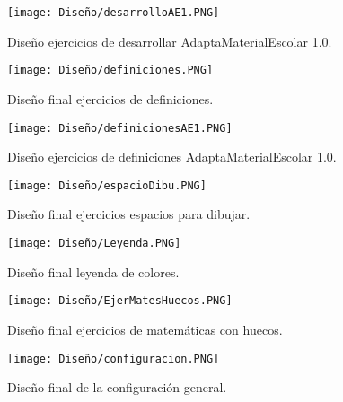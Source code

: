 \begin{figure}[ht!]
  \centering
  \texttt{[image: Diseño/desarrolloAE1.PNG]}
  \caption{Diseño ejercicios de desarrollar AdaptaMaterialEscolar 1.0.}
  \label{desAE1}
\end{figure}

\begin{figure}[ht!]
  \centering
  \texttt{[image: Diseño/definiciones.PNG]}
  \caption{Diseño final ejercicios de definiciones.}
  \label{defi}
\end{figure}

\begin{figure}[ht!]
  \centering
  \texttt{[image: Diseño/definicionesAE1.PNG]}
  \caption{Diseño ejercicios de definiciones AdaptaMaterialEscolar 1.0.}
  \label{defiAE1}
\end{figure}

\begin{figure}[ht!]
  \centering
  \texttt{[image: Diseño/espacioDibu.PNG]}
  \caption{Diseño final ejercicios espacios para dibujar.}
  \label{espaciosDibu}
\end{figure}

\begin{figure}[ht!]
  \centering
  \texttt{[image: Diseño/Leyenda.PNG]}
  \caption{Diseño final leyenda de colores.}
  \label{LeyendaColores}
\end{figure}


\begin{figure}[ht!]
  \centering
  \texttt{[image: Diseño/EjerMatesHuecos.PNG]}
  \caption{Diseño final ejercicios de matemáticas con huecos.}
  \label{matesHueco}
\end{figure}

\begin{figure}[ht!]
  \centering
  \texttt{[image: Diseño/configuracion.PNG]}
  \caption{Diseño final de la configuración general.}
  \label{configu}
\end{figure}




